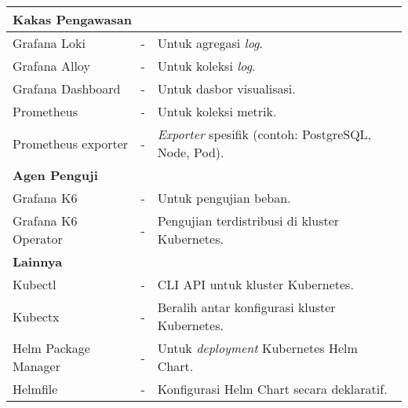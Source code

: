 \begin{longtable}{|l|l|p{}|}
    \multicolumn{3}{|l|}{\textbf{Kakas Pengawasan}} \\
    \hline
    Grafana Loki & - & Untuk agregasi \textit{log}. \\
    Grafana Alloy & - & Untuk koleksi \textit{log}. \\
    Grafana Dashboard & - & Untuk dasbor visualisasi. \\
    Prometheus & - & Untuk koleksi metrik. \\
    Prometheus exporter & - & \textit{Exporter} spesifik (contoh: PostgreSQL, Node, Pod). \\
    \hline

    \multicolumn{3}{|l|}{\textbf{Agen Penguji}} \\
    \hline
    Grafana K6 & - & Untuk pengujian beban. \\
    Grafana K6 Operator & - & Pengujian terdistribusi di kluster Kubernetes. \\
    \hline

    \multicolumn{3}{|l|}{\textbf{Lainnya}} \\
    \hline
    Kubectl & - & CLI API untuk kluster Kubernetes. \\
    Kubectx & - & Beralih antar konfigurasi kluster Kubernetes. \\
    Helm Package Manager & - & Untuk \textit{deployment} Kubernetes Helm Chart. \\
    Helmfile & - & Konfigurasi Helm Chart secara deklaratif. \\

\end{longtable}
\endgroup

